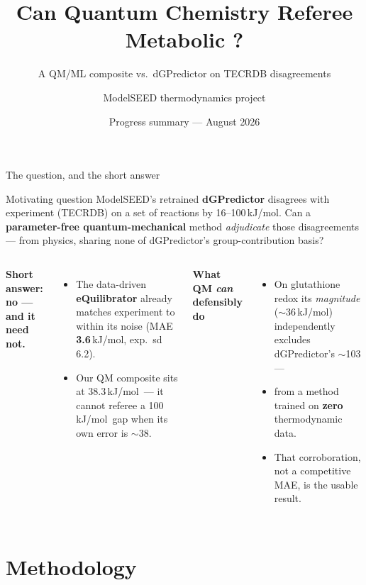 \documentclass[aspectratio=169,11pt]{beamer}
\title{Can Quantum Chemistry Referee Metabolic \dg?}
\subtitle{A QM/ML composite vs.\ dGPredictor on TECRDB disagreements}
\author{ModelSEED thermodynamics project}
\date{Progress summary — August 2026}
\newcommand{\kj}{\,kJ/mol}
\newcommand{\win}[1]{\textcolor{good}{\textbf{#1}}}
\newcommand{\lose}[1]{\textcolor{bad}{#1}}
\begin{document}
\maketitle

\begin{frame}{The question, and the short answer}
  \begin{block}{Motivating question}
    ModelSEED's retrained \textbf{dGPredictor} disagrees with experiment
    (TECRDB) on a set of reactions by 16--100\kj. Can a
    \textbf{parameter-free quantum-mechanical} method \emph{adjudicate} those
    disagreements — from physics, sharing none of dGPredictor's
    group-contribution basis?
  \end{block}
  \begin{columns}[T]
      \textbf{Short answer: no — and it need not.}
      \begin{itemize}
        \item The data-driven \textbf{eQuilibrator} already matches
              experiment to within its noise (MAE \win{3.6}\kj, exp.\ sd 6.2).
        \item Our QM composite sits at \lose{38.3}\kj\ — it cannot
              referee a 100\kj\ gap when its own error is $\sim$38.
      \end{itemize}
      \textbf{What QM \emph{can} defensibly do}
      \begin{itemize}
        \item On glutathione redox its \emph{magnitude} ($\sim$36\kj)
              independently excludes dGPredictor's $\sim$103 —
        \item from a method trained on \textbf{zero} thermodynamic data.
        \item That corroboration, not a competitive MAE, is the usable result.
      \end{itemize}
  \end{columns}
\end{frame}

\section{Methodology}
\end{document}
